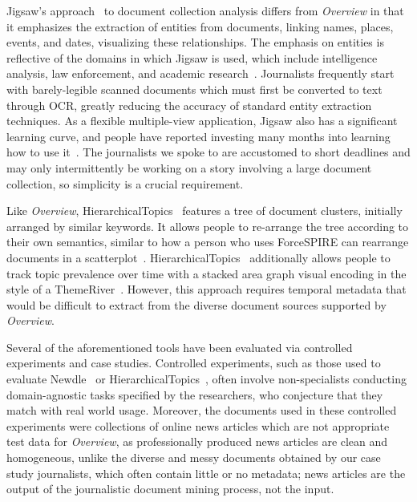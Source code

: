 Jigsaw's approach~\cite{Gorg2013,Kang2012} to document collection analysis differs from {\it Overview} in that it emphasizes the extraction of entities from documents, linking names, places, events, and dates, visualizing these relationships. 
The emphasis on entities is reflective of the domains in which Jigsaw is used, which include intelligence analysis, law enforcement, and academic research~\cite{Kang2012}.
Journalists frequently start with barely-legible scanned documents which must first be converted to text through \ac{OCR}, greatly reducing the accuracy of standard entity extraction techniques.
As a flexible multiple-view application, Jigsaw also has a significant learning curve, and people have reported investing many months into learning how to use it~\cite{Kang2012}.
The journalists we spoke to are accustomed to short deadlines and may only intermittently be working on a story involving a large document collection, so simplicity is a crucial requirement. 

Like {\it Overview}, HierarchicalTopics~\cite{Dou2013} features a tree of document clusters, initially arranged by similar keywords.
It allows people to re-arrange the tree according to their own semantics, similar to how a person who uses ForceSPIRE can rearrange documents in a scatterplot~\cite{Endert2012b}.
HierarchicalTopics~\cite{Dou2013} additionally allows people to track topic prevalence over time with a stacked area graph visual encoding in the style of a ThemeRiver~\cite{Havre2002}.
However, this approach requires temporal metadata that would be difficult to extract from the diverse document sources supported by {\it Overview}.

Several of the aforementioned tools have been evaluated via controlled experiments and case studies.
Controlled experiments, such as those used to evaluate Newdle~\cite{Liu2013} or HierarchicalTopics~\cite{Dou2013}, often involve non-specialists conducting domain-agnostic tasks specified by the researchers, who conjecture that they match with real world usage. 
Moreover, the documents used in these controlled experiments were collections of online news articles which are not appropriate test data for {\it Overview}, as professionally produced news articles are clean and homogeneous, unlike the diverse and messy documents obtained by our case study journalists, which often contain little or no metadata; news articles are the output of the journalistic document mining process, not the input.

